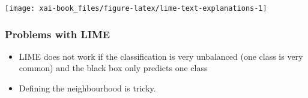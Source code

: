\documentclass[12pt,]{krantz}
\providecommand{\tightlist}{%
  \setlength{\itemsep}{0pt}\setlength{\parskip}{0pt}}
\theoremstyle{definition}
\theoremstyle{definition}
\theoremstyle{definition}
\theoremstyle{remark}
\begin{document}
\begin{center}\texttt{[image: xai-book\_files/figure-latex/lime-text-explanations-1]} \end{center}

\subsubsection{Problems with LIME}\label{problems-with-lime}

\begin{itemize}
\tightlist
\item
  LIME does not work if the classification is very unbalanced (one class
  is very common) and the black box only predicts one class
\item
  Defining the neighbourhood is tricky.
\end{itemize}



\backmatter
\end{document}

